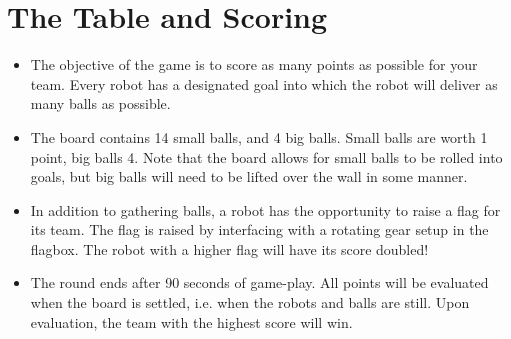 \section{The Table and Scoring}




\begin{itemize}

\item The objective of the game is to score as many points as possible for your team. Every robot has a designated goal into which the robot will deliver as many balls as possible.

\item The board contains 14 small balls, and 4 big balls. Small balls are worth 1 point, big balls 4. Note that the board allows for small balls to be rolled into goals, but big balls will need to be lifted over the wall in some manner.

\item In addition to gathering balls, a robot has the opportunity to raise a flag for its team. The flag is raised by interfacing with a rotating gear setup in the flagbox. The robot with a higher flag will have its score doubled!


\item The round ends after 90 seconds of game-play. All points will be evaluated when the board is settled, i.e. when the robots and balls are still. Upon evaluation, the team with the highest score will win.

\end{itemize}

